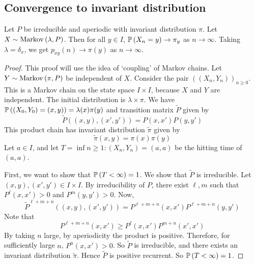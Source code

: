 \subsection{Convergence to invariant distribution}
\begin{theorem}
	Let \( P \) be irreducible and aperiodic with invariant distribution \( \pi \).
	Let \( X \sim \operatorname{Markov}\left({\lambda, P}\right) \).
	Then for all \( y \in I \), \( \mathbb{P}\left({X_n = y}\right) \to \pi_y \) as \( n \to \infty \).
	Taking \( \lambda = \delta_x \), we get \( p_{xy}(n) \to \pi(y) \) as \( n \to \infty \).
\end{theorem}
\begin{proof}
	This proof will use the idea of `coupling' of Markov chains.
	Let \( Y \sim \operatorname{Markov}\left({\pi, P}\right) \) be independent of \( X \).
	Consider the pair \( ((X_n, Y_n))_{n \geq 0} \).
	This is a Markov chain on the state space \( I \times I \), because \( X \) and \( Y \) are independent.
	The initial distribution is \( \lambda \times \pi \).
	We have \( \mathbb{P}\left({(X_0, Y_0) = (x,y)}\right) = \lambda(x) \pi(y) \) and transition matrix \( \widetilde P \) given by
	\[
		\widetilde P((x,y), (x',y')) = P(x,x') P(y,y')
	\]
	This product chain has invariant distribution \( \widetilde \pi \) given by
	\[
		\widetilde \pi(x,y) = \pi(x) \pi(y)
	\]
	Let \( a \in I \), and let \( T = \inf{n \geq 1 \colon (X_n, Y_n) = (a,a)} \) be the hitting time of \( (a,a) \).

	First, we want to show that \( \mathbb{P}\left({T < \infty}\right) = 1 \).
	We show that \( \widetilde P \) is irreducible.
	Let \( (x,y), (x',y') \in I \times I \).
	By irreducibility of \( P \), there exist \( \ell, m \) such that \( P^\ell(x,x') > 0 \) and \( P^m(y,y') > 0 \).
	Now,
	\[
		\widetilde P^{\ell + m + n}((x,y), (x', y')) = P^{\ell+m+n}(x,x')P^{\ell+m+n}(y,y')
	\]
	Note that
	\[
		P^{\ell+m+n}(x,x') \geq P^\ell(x,x') P^{m+n}(x',x')
	\]
	By taking \( n \) large, by aperiodicity the product is positive.
	Therefore, for sufficiently large \( n \), \( P^n(x,x') > 0 \).
	So \( \widetilde P \) is irreducible, and there exists an invariant distribution \( \widetilde \pi \).
	Hence \( \widetilde P \) is positive recurrent.
	So \( \mathbb{P}\left({T < \infty}\right) = 1 \).


\end{proof}
